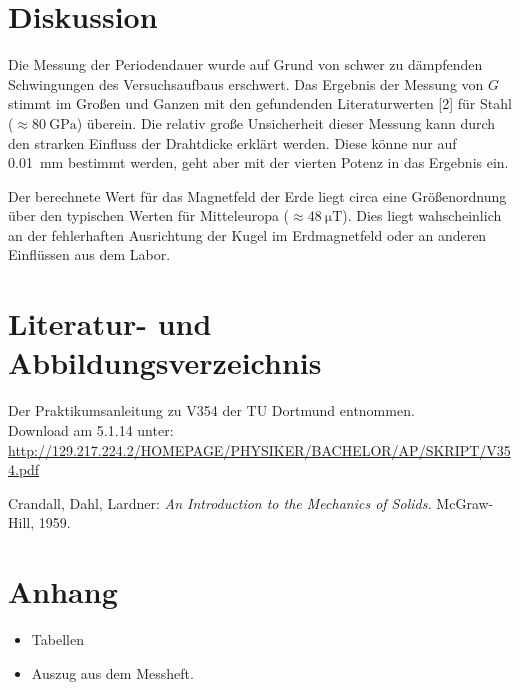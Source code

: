 \documentclass[11pt,ngerman,a4paper]{article}
\begin{document}
\section{Diskussion}
Die Messung der Periodendauer wurde auf Grund von schwer zu dämpfenden Schwingungen des Versuchsaufbaus erschwert. Das Ergebnis der Messung von $G$ stimmt im Großen und Ganzen mit den gefundenden Literaturwerten [2] für Stahl ($\approx \SI{80}{\giga\pascal}$) überein. Die relativ große Unsicherheit dieser Messung kann durch den strarken Einfluss der Drahtdicke erklärt werden. Diese könne nur auf \SI{0,01}{\milli\metre} bestimmt werden, geht aber mit der vierten Potenz in das Ergebnis ein. 

\noindent
Der berechnete Wert für das Magnetfeld der Erde liegt circa eine Größenordnung über den typischen Werten für Mitteleuropa ($\approx \SI{48}{\micro\tesla}$). Dies liegt wahscheinlich an der fehlerhaften Ausrichtung der Kugel im Erdmagnetfeld oder an anderen Einflüssen aus dem Labor.   

\section{Literatur- und Abbildungsverzeichnis}
\begin{enumerate}[{[}1{]}]
\item Der Praktikumsanleitung zu V354 der TU Dortmund entnommen. \\
Download am 5.1.14 unter:
 \newline \url{http://129.217.224.2/HOMEPAGE/PHYSIKER/BACHELOR/AP/SKRIPT/V354.pdf}
 \item Crandall, Dahl, Lardner: \textit{An Introduction to the Mechanics of Solids.} McGraw-Hill, 1959.

\end{enumerate}
\section{Anhang}
\begin{itemize}
\item Tabellen
\item Auszug aus dem Messheft.


\end{itemize}
\end{document}

